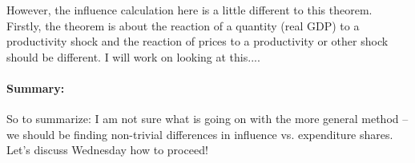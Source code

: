 \documentclass[12pt,english]{article}
\begin{document}
However, the influence calculation here is a little different to this theorem. Firstly, the theorem is about the reaction of a quantity (real GDP) to a productivity shock and the reaction of prices to a productivity or other shock should be different. I will work on looking at this.... 

\paragraph{Summary:}

So to summarize: I am not sure what is going on with the more general method -- we should be finding non-trivial differences in influence vs. expenditure shares. Let's discuss Wednesday how to proceed!
\end{document}
